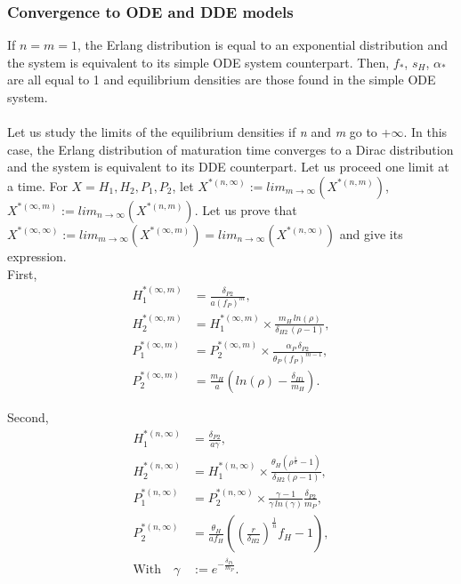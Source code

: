 \documentclass[12pt,a4paper,onecolumn]{article}
\begin{document}
\subsubsection{Convergence to ODE and DDE models}
If $n = m = 1$, the Erlang distribution is equal to an exponential distribution and the system is equivalent to its simple ODE system counterpart. Then, $f_*$, $s_H$, $\alpha_*$ are all equal to 1 and equilibrium densities are those found in the simple ODE system. \\ \\

Let us study the limits of the equilibrium densities if \textit{n} and \textit{m} go to +$\infty$. In this case, the Erlang distribution of maturation time converges to a Dirac distribution and the system is equivalent to its DDE counterpart. Let us proceed one limit at a time. For $X = H_1, H_2, P_1, P_2$, let $X^{*(n, \infty)} := lim_{m\to\infty}(X^{*(n,m)})$,  $X^{*(\infty,m)} := lim_{n\to\infty}(X^{*(n,m)})$. Let us prove that $X^{*(\infty, \infty)} := lim_{m\to\infty} (X^{*(\infty, m)}) = lim_{n\to\infty}(X^{*(n,\infty)})$ and give its expression. \\

First, 
\begin{align}
H_1^{*(\infty,m)} &= \frac{\delta_{P2}}{a(f_P)^m}, \nonumber \\
H_2^{*(\infty,m)} &= H_1^{*(\infty,m)} \times \frac{m_H \, ln(\rho)}{\delta_{H2} \, (\rho -1)}, \nonumber \\
P_1^{*(\infty,m)} &= P_2^{*(\infty,m)} \times \frac{\alpha_P \, \delta_{P2}}{\theta_P (f_P)^{m-1}},  \\
P_2^{*(\infty,m)} &= \frac{m_H}{a}(ln(\rho) - \frac{\delta_{H1}}{m_H}). \nonumber 
\end{align}

Second, 
\begin{align}
H_1^{*(n,\infty)} &= \frac{\delta_{P2}}{a \gamma}, \nonumber \\
H_2^{*(n,\infty)} &= H_1^{*(n,\infty)} \times \frac{\theta_{H} (\rho^{\frac{1}{n}}-1)}{\delta_{H2} (\rho-1)}, \nonumber \\
P_1^{*(n,\infty)} &= P_2^{*(n,\infty)} \times \frac{\gamma - 1}{\gamma \, ln(\gamma)} \frac{\delta_{P2}}{m_P},  \\
P_2^{*(n,\infty)} &= \frac{\theta_H}{a f_H} ((\frac{r}{\delta_{H2}})^{\frac{1}{n}}f_H -1), \nonumber \\
\text{With} \quad \gamma & := e^{-\frac{\delta_{P1}}{m_P}}. \nonumber
\end{align}
\end{document}
